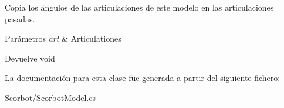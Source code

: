 Copia los ángulos de las articulaciones de este modelo en las articulaciones pasadas. 
\begin{DoxyParams}{Parámetros}
{\em art} & Articulationes \\
\hline
\end{DoxyParams}
\begin{DoxyReturn}{Devuelve}
void 
\end{DoxyReturn}


La documentación para esta clase fue generada a partir del siguiente fichero\+:\begin{DoxyCompactItemize}
\item 
Scorbot/Scorbot\+Model.\+cs\end{DoxyCompactItemize}
